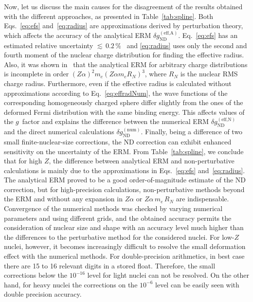 Now, let us discuss the main causes for the disagreement of the results obtained with the different approaches, as presented in Table~\ref{tab:spline}. Both Eqs.~\eqref{eq:efs} and~\eqref{eq:radius} are approximations derived by perturbation theory, which affects the accuracy of the analytical ERM $\delta g_{\text{ND}}^{(\text{eff,A})}$. Eq.~\eqref{eq:efs} has an estimated relative uncertainty ${\scriptstyle\lesssim}\,0.2\,\%$~\cite{Shabaev1993} and \eqref{eq:radius} uses only the second and fourth moment of the nuclear charge distribution for finding the effective radius. Also, it was shown in~\cite{karshenboim2018} that the analytical ERM for arbitrary charge distributions is incomplete in order $(Z\alpha)^2m_e(Z\alpha m_e R_N)^3$, where $R_N$ is the nuclear RMS charge radius. Furthermore, even if the effective radius is calculated without approximations according to Eq.~\eqref{eq:effradNum}, the wave functions of the corresponding homogeneously charged sphere differ slightly from the ones of the deformed Fermi distribution with the same binding energy. This affects values of the $g$~factor and explains the difference between the numerical ERM $\delta g_{\text{ND}}^{(\text{eff,N})}$ and the direct numerical calculations $\delta g_{\text{ND}}^{(\text{num})}$. 
Finally, being a difference of two small finite-nuclear-size corrections, the ND correction can exhibit enhanced sensitivity on the uncertainty of the ERM.
From Table~\ref{tab:spline}, we conclude that for high $Z$, the difference between analytical ERM and non-perturbative calculations is mainly due to the approximations in Eqs.~\eqref{eq:efs} and~\eqref{eq:radius}. The analytical ERM proved to be a good order-of-magnitude estimate of the ND correction, but for high-precision calculations, non-perturbative methods beyond the ERM and without any expansion in $Z\alpha$ or $Z\alpha\, m_e\, R_N$ are indispensable. Convergence of the numerical methods was checked by varying numerical parameters and using different grids, and the obtained accuracy permits the consideration of nuclear size and shape with an accuracy level much higher than the differences to the perturbative method for the considered nuclei. For low-$Z$ nuclei, however, it becomes increasingly difficult to resolve the small deformation effect with the numerical methods. For double-precision arithmetics, in best case there are 15 to 16 relevant digits in a stored float. Therefore, the small corrections below the $10^{-16}$ level for light nuclei can not be resolved. On the other hand, for heavy nuclei the corrections on the $10^{-6}$ level can be easily seen with double precision accuracy.\\

